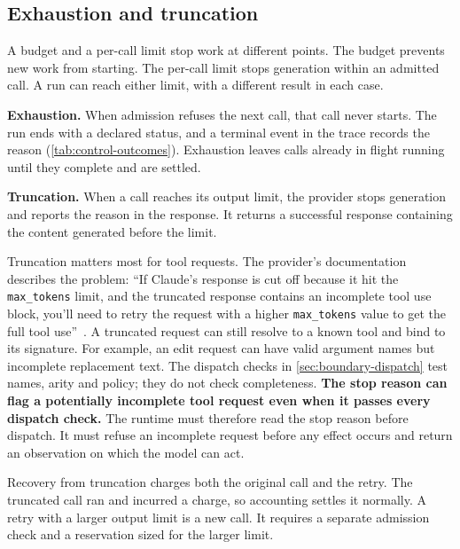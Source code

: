 \subsection{Exhaustion and truncation}
\label{sec:budgets-limits}

A budget and a per-call limit stop work at different points. The budget prevents new work from
starting. The per-call limit stops generation within an admitted call. A run can reach either
limit, with a different result in each case.

\bi

\item \textbf{Exhaustion.} When admission refuses the next call, that call never starts. The run
ends with a declared status, and a terminal event in the trace records the reason
(\cref{tab:control-outcomes}). Exhaustion leaves calls already in flight running until they
complete and are settled.

\item \textbf{Truncation.} When a call reaches its output limit, the provider stops generation and
reports the reason in the response. It returns a successful response containing the content
generated before the limit.

\ei

Truncation matters most for tool requests. The provider's documentation describes the problem:
``If Claude's response is cut off because it hit the \texttt{max\_tokens} limit,
and the truncated response contains an incomplete tool use block, you'll need to retry the request
with a higher \texttt{max\_tokens} value to get the full tool use''~\citep{anthropic-stop-reasons}.
A truncated request can still resolve to a known tool and bind to its signature. For example, an
edit request can have valid argument names but incomplete replacement text. The dispatch checks in
\cref{sec:boundary-dispatch} test names, arity and policy; they do not check completeness.
\textbf{The stop reason can flag a potentially incomplete tool request even when it passes every
dispatch check.} The runtime must therefore read the stop reason before dispatch. It must refuse an
incomplete request before any effect occurs and return an observation on which the model can act.

Recovery from truncation charges both the original call and the retry. The truncated call ran and
incurred a charge, so accounting settles it normally. A retry with a larger output limit is a new
call. It requires a separate admission check and a reservation sized for the larger limit.

